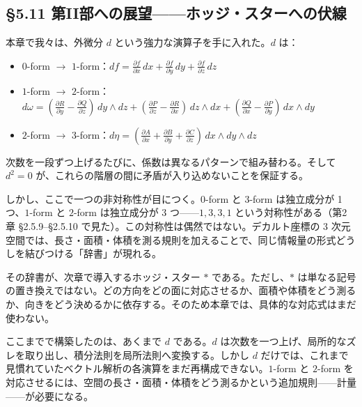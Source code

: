 \documentclass[a4paper,12pt,openany]{book}
\begin{document}
\hypertarget{ux7b2ciiux90e8ux3078ux306eux5c55ux671bux30dbux30c3ux30b8ux30b9ux30bfux30fcux3078ux306eux4f0fux7dda}{%
\subsection{§5.11
第II部への展望——ホッジ・スターへの伏線}\label{ux7b2ciiux90e8ux3078ux306eux5c55ux671bux30dbux30c3ux30b8ux30b9ux30bfux30fcux3078ux306eux4f0fux7dda}}

本章で我々は、外微分 \(d\) という強力な演算子を手に入れた。\(d\) は：

\begin{itemize}
\item
  \(0\)-form \(\to\)
  \(1\)-form：\(df = \frac{\partial f}{\partial x}\,dx + \frac{\partial f}{\partial y}\,dy + \frac{\partial f}{\partial z}\,dz\)
\item
  \(1\)-form \(\to\)
  \(2\)-form：\(d\omega = (\frac{\partial R}{\partial y}-\frac{\partial Q}{\partial z})\,dy\wedge dz + (\frac{\partial P}{\partial z}-\frac{\partial R}{\partial x})\,dz\wedge dx + (\frac{\partial Q}{\partial x}-\frac{\partial P}{\partial y})\,dx\wedge dy\)
\item
  \(2\)-form \(\to\)
  \(3\)-form：\(d\eta = (\frac{\partial A}{\partial x}+\frac{\partial B}{\partial y}+\frac{\partial C}{\partial z})\,dx\wedge dy\wedge dz\)
\end{itemize}

次数を一段ずつ上げるたびに、係数は異なるパターンで組み替わる。そして
\(d^2=0\) が、これらの階層の間に矛盾が入り込めないことを保証する。

しかし、ここで一つの非対称性が目につく。\(0\)-form と \(3\)-form
は独立成分が 1 つ、\(1\)-form と \(2\)-form は独立成分が 3
つ——\(1, 3, 3, 1\) という対称性がある（第2章 §2.5.9–§2.5.10
で見た）。この対称性は偶然ではない。デカルト座標の 3
次元空間では、長さ・面積・体積を測る規則を加えることで、同じ情報量の形式どうしを結びつける「辞書」が現れる。

その辞書が、次章で導入するホッジ・スター \(\ast\)
である。ただし、\(\ast\)
は単なる記号の置き換えではない。どの方向をどの面に対応させるか、面積や体積をどう測るか、向きをどう決めるかに依存する。そのため本章では、具体的な対応式はまだ使わない。

ここまでで構築したのは、あくまで \(d\) である。\(d\)
は次数を一つ上げ、局所的なズレを取り出し、積分法則を局所法則へ変換する。しかし
\(d\)
だけでは、これまで見慣れていたベクトル解析の各演算をまだ再構成できない。\(1\)-form
と \(2\)-form
を対応させるには、空間の長さ・面積・体積をどう測るかという追加規則——計量——が必要になる。
\end{document}
